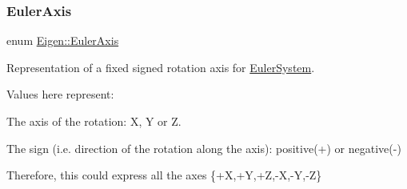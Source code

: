 \mbox{\label{namespace_eigen_ae614aa7cdd687fb5c421a54f2ce5c361}} 
\subsubsection{\texorpdfstring{Euler\+Axis}{EulerAxis}\hspace{0.1cm}{\footnotesize\ttfamily [1/2]}}
{\footnotesize\ttfamily enum \hyperlink{namespace_eigen_ae614aa7cdd687fb5c421a54f2ce5c361}{Eigen\+::\+Euler\+Axis}}



Representation of a fixed signed rotation axis for \hyperlink{class_eigen_1_1_euler_system}{Euler\+System}. 

Values here represent\+:
\begin{DoxyItemize}
\item The axis of the rotation\+: X, Y or Z.
\item The sign (i.\+e. direction of the rotation along the axis)\+: positive(+) or negative(-\/)
\end{DoxyItemize}

Therefore, this could express all the axes \{+X,+Y,+Z,-\/X,-\/Y,-\/Z\}

